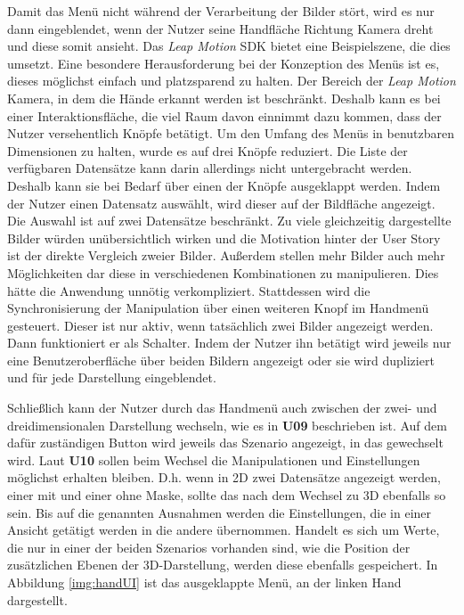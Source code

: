 Damit das Menü nicht während der Verarbeitung der Bilder stört, wird es nur dann eingeblendet, wenn der Nutzer seine Handfläche Richtung Kamera dreht und diese somit ansieht. Das \textit{Leap Motion} SDK bietet eine Beispielszene, die dies umsetzt.
Eine besondere Herausforderung bei der Konzeption des Menüs ist es, dieses möglichst einfach und platzsparend zu halten. Der Bereich der \textit{Leap Motion} Kamera, in dem die Hände erkannt werden ist beschränkt. Deshalb kann es bei einer Interaktionsfläche, die viel Raum davon einnimmt dazu kommen, dass der Nutzer versehentlich Knöpfe betätigt. 
Um den Umfang des Menüs in benutzbaren Dimensionen zu halten, wurde es auf drei Knöpfe reduziert. 
Die Liste der verfügbaren Datensätze kann darin allerdings nicht untergebracht werden. Deshalb kann sie bei Bedarf über einen der Knöpfe ausgeklappt werden. 
Indem der Nutzer einen Datensatz auswählt, wird dieser auf der Bildfläche angezeigt. Die Auswahl ist auf zwei Datensätze beschränkt. Zu viele gleichzeitig dargestellte Bilder würden unübersichtlich wirken und die Motivation hinter der User Story ist der direkte Vergleich zweier Bilder. Außerdem stellen mehr Bilder auch mehr Möglichkeiten dar diese in verschiedenen Kombinationen zu manipulieren. Dies hätte die Anwendung unnötig verkompliziert. 
Stattdessen wird die Synchronisierung der Manipulation über einen weiteren Knopf im Handmenü gesteuert. Dieser ist nur aktiv, wenn tatsächlich zwei Bilder angezeigt werden. Dann funktioniert er als Schalter. Indem der Nutzer ihn betätigt wird jeweils nur eine Benutzeroberfläche über beiden Bildern angezeigt oder sie wird dupliziert und für jede Darstellung eingeblendet. 
 
Schließlich kann der Nutzer durch das Handmenü auch zwischen der zwei- und dreidimensionalen Darstellung wechseln, wie es in \textbf{U09} beschrieben ist. Auf dem dafür zuständigen Button wird jeweils das Szenario angezeigt, in das gewechselt wird.
Laut \textbf{U10} sollen beim Wechsel die Manipulationen und Einstellungen möglichst erhalten bleiben. D.h. wenn in 2D zwei Datensätze angezeigt werden, einer mit und einer ohne Maske, sollte das nach dem Wechsel zu 3D ebenfalls so sein. 
Bis auf die genannten Ausnahmen werden die Einstellungen, die in einer Ansicht getätigt werden in die andere übernommen. Handelt es sich um Werte, die nur in einer der beiden Szenarios vorhanden sind, wie die Position der zusätzlichen Ebenen der 3D-Darstellung, werden diese ebenfalls gespeichert.
In Abbildung \ref{img:handUI} ist das ausgeklappte Menü, an der linken Hand dargestellt.


